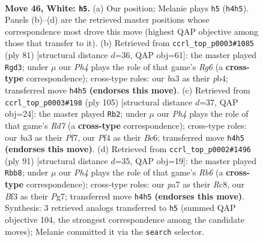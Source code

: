 \documentclass[11pt]{article}
\begin{document}
\clearpage

\begin{figure}[p]\centering
\begin{subfigure}{0.46\textwidth}\centering
\resizebox{\linewidth}{!}{%
\newchessgame
\chessboard[
  setfen={8/pp6/6pk/4R3/5P1P/bq3BK1/8/8 w - - 4 46},
  showmover=false,
  pgfstyle=straightmove, color=movearrow, markmove={h4-h5}
]}
\caption{}
\end{subfigure}\hfill
\begin{subfigure}{0.46\textwidth}\centering
\resizebox{\linewidth}{!}{%
\newchessgame
\chessboard[
  setfen={8/1Q2bk2/3r3p/P7/1PP1K2P/6r1/8/8 b - - 2 41},
  showmover=false,
  pgfstyle=straightmove, color=movearrow, markmove={g3-d3}
]}
\caption{}
\end{subfigure}
\\[4pt]
\begin{subfigure}{0.46\textwidth}\centering
\resizebox{\linewidth}{!}{%
\newchessgame
\chessboard[
  setfen={6k1/5pb1/4b2p/8/4B2P/4K1Q1/3r4/8 b - - 7 53},
  showmover=false,
  pgfstyle=straightmove, color=movearrow, markmove={d2-b2}
]}
\caption{}
\end{subfigure}\hfill
\begin{subfigure}{0.46\textwidth}\centering
\resizebox{\linewidth}{!}{%
\newchessgame
\chessboard[
  setfen={2r5/3Q2pk/2P2p1p/5P2/8/1r6/6PK/8 b - - 1 46},
  showmover=false,
  pgfstyle=straightmove, color=movearrow, markmove={b3-b8}
]}
\caption{}
\end{subfigure}
\caption{\textbf{Move 46, White: \texttt{h5}.} (a) Our position; Melanie plays \texttt{h5} (\texttt{h4h5}). Panels (b)--(d) are the retrieved master positions whose correspondence most drove this move (highest QAP objective among those that transfer to it). (b) Retrieved from \texttt{ccrl\_top\_p0003\#1085} (ply 81) [structural distance $d$=36, QAP obj=61]: the master played \texttt{Rgd3}; under $\mu$ our \emph{Ph4} plays the role of that game's \emph{Rg6} (a \textbf{cross-type} correspondence); cross-type roles: our \emph{b}a3 as their \emph{p}b4; transferred move \texttt{h4h5} \textbf{(endorses this move)}. (c) Retrieved from \texttt{ccrl\_top\_p0003\#198} (ply 105) [structural distance $d$=37, QAP obj=24]: the master played \texttt{Rb2}; under $\mu$ our \emph{Ph4} plays the role of that game's \emph{Rd7} (a \textbf{cross-type} correspondence); cross-type roles: our \emph{b}a3 as their \emph{P}f7, our \emph{P}f4 as their \emph{B}e6; transferred move \texttt{h4h5} \textbf{(endorses this move)}. (d) Retrieved from \texttt{ccrl\_top\_p0002\#1496} (ply 91) [structural distance $d$=35, QAP obj=19]: the master played \texttt{Rbb8}; under $\mu$ our \emph{Ph4} plays the role of that game's \emph{Rb6} (a \textbf{cross-type} correspondence); cross-type roles: our \emph{p}a7 as their \emph{R}c8, our \emph{B}f3 as their \emph{P}g7; transferred move \texttt{h4h5} \textbf{(endorses this move)}. Synthesis: 3 retrieved analogs transferred to \texttt{h5} (summed QAP objective 104, the strongest correspondence among the candidate moves); Melanie committed it via the \texttt{search} selector.}
\label{fig:thought-m90}
\end{figure}
\end{document}
